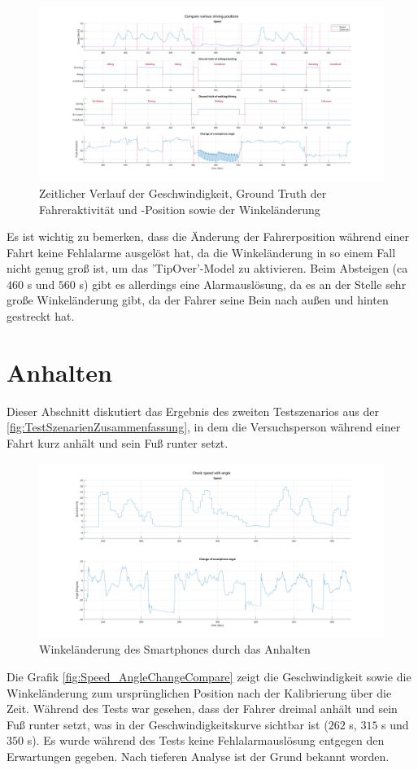 \begin{figure}[H]
	\centering
	\includegraphics[width=\linewidth]{Bilder/Speed_Groundtruth_WalkStand_Compare.png}
	\caption{Zeitlicher Verlauf der Geschwindigkeit, Ground Truth der Fahreraktivität und -Position sowie der Winkeländerung}
	\label{fig:Speed_Groundtruth_WalkStand_Compare}
\end{figure}

Es ist wichtig zu bemerken, dass die Änderung der Fahrerposition während einer Fahrt keine Fehlalarme ausgelöst hat, da die Winkeländerung in so einem Fall nicht genug groß ist, um das 'TipOver'-Model zu aktivieren. Beim Absteigen (ca $460$ s und $560$ s) gibt es allerdings eine Alarmauslösung, da es an der Stelle sehr große Winkeländerung gibt, da der Fahrer seine Bein nach außen und hinten gestreckt hat.
\section{Anhalten}
Dieser Abschnitt diskutiert das Ergebnis des zweiten Testszenarios aus der \autoref{fig:TestSzenarienZusammenfassung}, in dem die Versuchsperson während einer Fahrt kurz anhält und sein Fuß runter setzt.

\begin{figure}
	\centering
	\includegraphics[width=\linewidth]{Bilder/Speed_AngleChangeCompare.png}
	\caption{Winkeländerung des Smartphones durch das Anhalten}
	\label{fig:Speed_AngleChangeCompare}
\end{figure}
Die Grafik \autoref{fig:Speed_AngleChangeCompare} zeigt die Geschwindigkeit sowie die Winkeländerung zum ursprünglichen Position nach der Kalibrierung über die Zeit.
Während des Tests war gesehen, dass der Fahrer dreimal anhält und sein Fuß runter setzt, was in der Geschwindigkeitskurve sichtbar ist ($262$ s, $315$ s und $350$ s). Es wurde während des Tests keine Fehlalarmauslösung entgegen den Erwartungen gegeben. Nach tieferen Analyse ist der Grund bekannt worden.

